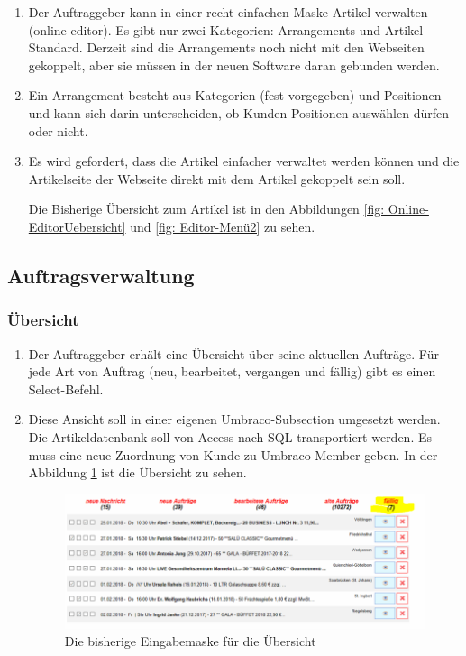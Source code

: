 \begin{enumerate}
	\item Der Auftraggeber kann in einer recht einfachen Maske Artikel verwalten (online-editor). Es gibt nur zwei Kategorien: Arrangements und Artikel-Standard. Derzeit sind die Arrangements noch nicht mit den Webseiten gekoppelt, aber sie müssen in der neuen Software daran gebunden werden.
	\item Ein Arrangement besteht aus Kategorien (fest vorgegeben) und Positionen und kann sich darin unterscheiden, ob Kunden Positionen auswählen dürfen oder nicht.
	\item Es wird gefordert, dass die Artikel einfacher verwaltet werden können und die Artikelseite der Webseite direkt mit dem Artikel gekoppelt sein soll.
	
	Die Bisherige Übersicht zum Artikel ist in den Abbildungen \ref{fig: Online-EditorUebersicht} und \ref{fig: Editor-Menü2} zu sehen.
	
\end{enumerate} 


\subsection{Auftragsverwaltung}

\subsubsection{Übersicht}

\begin{enumerate}
	\item Der Auftraggeber erhält eine Übersicht über seine aktuellen Aufträge. Für jede Art von Auftrag (neu, bearbeitet, vergangen und fällig) gibt es einen Select-Befehl.
	\item Diese Ansicht soll in einer eigenen Umbraco-Subsection umgesetzt werden. Die Artikeldatenbank soll von Access nach SQL transportiert werden. Es muss eine neue Zuordnung von Kunde zu Umbraco-Member geben. In der Abbildung \ref{fig:Uebersicht} ist die Übersicht zu sehen.
	
	\begin{figure}[h]
		\centering
		\includegraphics[width=0.7\linewidth]{Graphics/Uebersicht.png}
		\caption[Uebersicht]{Die bisherige Eingabemaske für die Übersicht}
		\label{fig:Uebersicht}
	\end{figure}
\end{enumerate} 



